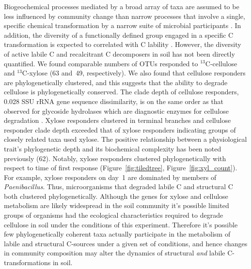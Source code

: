 Biogeochemical processes mediated by a broad array of taxa are assumed to
be less influenced by community change than narrow processes that involve
a single, specific chemical transformation by a narrow suite of microbial
participants \citep{Schimel_1995,McGuire2010}. In addition, the diversity of
a functionally defined group engaged in a specific C transformation is expected
to correlated with C lability \citep{McGuire2010}. However, the diversity of
active labile C and recalcitrant C decomposers in soil has not been directly
quantified. We found comparable numbers of OTUs responded to $^{13}$C-cellulose
and $^{13}$C-xylose (63 and~49, respectively). We also found that cellulose
responders are phylogenetically clustered, and this suggests that the ability
to degrade cellulose is phylogenetically conserved. The clade depth of
cellulose responders, 0.028 SSU rRNA gene sequence dissimilarity, is on the
same order as that observed for glycoside hydrolases which are diagnostic
enzymes for cellulose degradation \citep{Berlemont2013}. Xylose responders
clustered in terminal branches and cellulose responder clade depth
exceeded that of xylose responders indicating groups of closely related
taxa used xylose. The positive relationship between a physiological
trait’s phylogenetic depth and its biochemical complexity has been noted
previously (62). Notably, xylose responders clustered phylogenetically
with respect to time of first response (Figure~\ref{fig:tiledtree},
Figure~\ref{fig:xyl_count}). For example, xylose responders on day~1 are
dominated by members of \textit{Paenibacillus}. Thus, microorganisms that
degraded labile C and
structural C both clustered phylogenetically. Although the genes for
xylose and cellulose metabolism are likely widespread in the soil
community it's possible limited groups of organisms had the ecological
characteristics required to degrade cellulose in soil under the conditions
of this experiment. Therefore it's possible few phylogenetically coherent
taxa actually participate in the metabolism of labile and structural
C-sources under a given set of conditions, and hence changes in community
composition may alter the dynamics of structural \textit{and} labile
C-transformations in soil.


